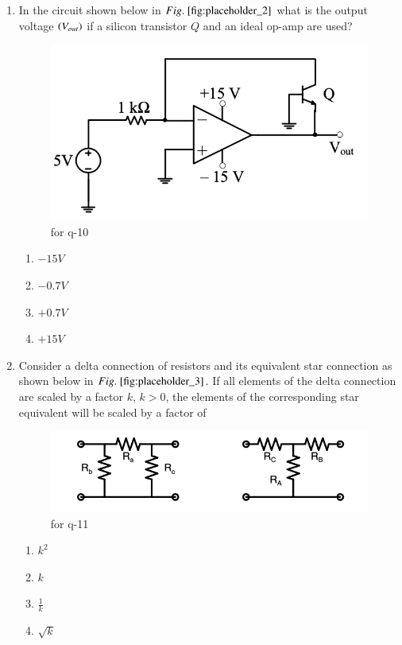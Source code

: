 \documentclass[journal,12pt,onecolumn]{IEEEtran}
\theoremstyle{remark}
\begin{document}
\begin{enumerate}
\item In the circuit shown below in $\figref{fig:placeholder_2}$ what is the output voltage $\left(V_{out}\right)$ if a silicon transistor $Q$ and an ideal op-amp are used?
\begin{figure}[H]
    \centering
    \includegraphics[width=0.5\columnwidth]{figs/fig_2.png}
    \caption{\centering for q-10}
    \label{fig:placeholder_2}
\end{figure}
\begin{multicols}{4}
    \begin{enumerate}
        \item $-15 V$
        \item $-0.7 V$
        \item $+0.7 V$
        \item $+15 V$
    \end{enumerate}
\end{multicols}
\hfill {}

\item Consider a delta connection of resistors and its equivalent star connection as shown below in $\figref{fig:placeholder_3}$. If all elements of the delta connection are scaled by a factor $k$, $k> 0$, the elements of the corresponding star equivalent will be scaled by a factor of 
\begin{figure}[H]
    \centering
    \includegraphics[width=0.5\columnwidth]{figs/fig_3.png}
    \caption{\centering for q-11}
    \label{fig:placeholder_3}
\end{figure}
\begin{multicols}{4}
    \begin{enumerate}
        \item $k^2$
        \item $k$
        \item $\frac{1}{k}$
        \item $\sqrt{k}$
    \end{enumerate}
\end{multicols}
\hfill {}


\end{enumerate}
\end{document}
